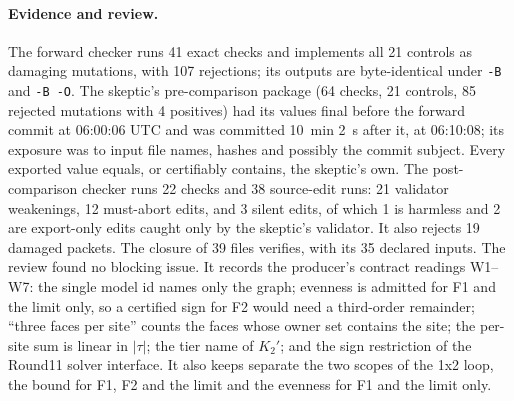 \paragraph{Evidence and review.} The forward checker runs 41 exact checks and
implements all 21 controls as damaging mutations, with 107 rejections; its
outputs are byte-identical under \texttt{-B} and \texttt{-B -O}. The skeptic's
pre-comparison package (64 checks, 21 controls, 85 rejected mutations with 4
positives) had its values final before the forward commit at 06:00:06 UTC and
was committed 10~min 2~s after it, at 06:10:08; its exposure was to input
file names, hashes and possibly the commit subject. Every exported value
equals, or certifiably contains, the skeptic's own. The post-comparison
checker runs 22 checks and 38 source-edit runs: 21 validator weakenings, 12
must-abort edits, and 3 silent edits, of which 1 is harmless and 2 are
export-only edits caught only by the skeptic's validator. It also rejects 19
damaged packets. The closure of 39 files verifies, with its 35 declared
inputs. The review found no blocking issue. It records the producer's
contract readings W1--W7: the single model id names only the graph;
evenness is admitted for F1 and the limit only, so a certified sign for F2
would need a third-order remainder; ``three faces per site'' counts the faces
whose owner set contains the site; the per-site sum is linear in $|\tau|$;
the tier name of $K_2'$; and the sign restriction of the Round11 solver
interface. It also keeps separate the two scopes of the 1x2 loop, the bound
for F1, F2 and the limit and the evenness for F1 and the limit only.

